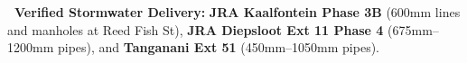 \vfill

\noindent
\begin{tcolorbox}[enhanced, colback=white, colframe=mhnavy, boxrule=0.8pt, arc=3pt, left=8pt, right=8pt, top=6pt, bottom=6pt, drop shadow=black!3]
    {\fontsize{8pt}{10.6pt}\selectfont\color{mhnavy}\bfseries\faCheckCircle\ Verified Stormwater Delivery:}\quad
    {\fontsize{8pt}{10.6pt}\selectfont\color{mhtext}
    \textbf{JRA Kaalfontein Phase 3B} (600mm lines and manholes at Reed Fish St), \textbf{JRA Diepsloot Ext 11 Phase 4} (675mm--1200mm pipes), and \textbf{Tanganani Ext 51} (450mm--1050mm pipes).
    }
\end{tcolorbox}

\clearpage
